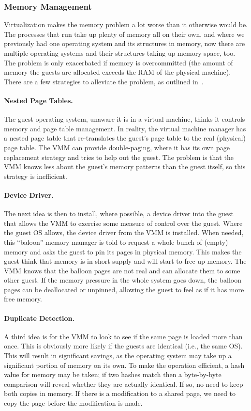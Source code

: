 \subsubsection*{Memory Management}

Virtualization makes the memory problem a lot worse than it otherwise would be. The processes that run take up plenty of memory all on their own, and where we previously had one operating system and its structures in memory, now there are multiple operating systems and their structures taking up memory space, too. The problem is only exacerbated if memory is overcommitted (the amount of memory the guests are allocated exceeds the RAM of the physical machine). There are a few strategies to alleviate the problem, as outlined in~\cite{osc}.

\paragraph{Nested Page Tables.} The guest operating system, unaware it is in a virtual machine, thinks it controls memory and page table management. In reality, the virtual machine manager has a nested page table that re-translates the guest's page  table to the real (physical) page table. The VMM can provide double-paging, where it has its own page replacement strategy and tries to help out the guest. The problem is that the VMM knows less about the guest's memory patterns than the guest itself, so this strategy is inefficient.

\paragraph{Device Driver.} The next idea is then to install, where possible, a device driver into the guest that allows the VMM to exercise some measure of control over the guest. Where the guest OS allows, the device driver from the VMM is installed. When needed, this ``baloon'' memory manager is told to request a whole bunch of (empty) memory and asks the guest to pin its pages in physical memory. This makes the guest think that memory is in short supply and will start to free up memory. The VMM knows that the balloon pages are not real and can allocate them to some other guest. If the memory pressure in the whole system goes down, the balloon pages can be deallocated or unpinned, allowing the guest to feel as if it has more free memory.

\paragraph{Duplicate Detection.} A third idea is for the VMM to look to see if the same page is loaded more than once. This is obviously more likely if the guests are identical (i.e., the same OS). This will result in significant savings, as the operating system may take up a significant portion of memory on its own. To make the operation efficient, a hash value for memory may be taken; if two hashes match then a byte-by-byte comparison will reveal whether they are actually identical. If so, no need to keep both copies in memory. If there is a modification to a shared page, we need to copy the page before the modification is made.

